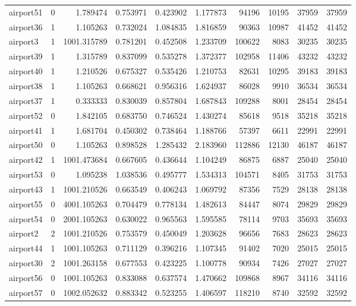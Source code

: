 \begin{longtable}{|l|r|r|r|r|r|r|r|r|r|}
airport51 & 0 & 1.789474 & 0.753971 & 0.423902 & 1.177873 & 94196 & 10195 & 37959 & 37959 \\
airport36 & 1 & 1.105263 & 0.732024 & 1.084835 & 1.816859 & 90363 & 10987 & 41452 & 41452 \\
airport3 & 1 & 1001.315789 & 0.781201 & 0.452508 & 1.233709 & 100622 & 8083 & 30235 & 30235 \\
airport39 & 1 & 1.315789 & 0.837099 & 0.535278 & 1.372377 & 102958 & 11406 & 43232 & 43232 \\
airport40 & 1 & 1.210526 & 0.675327 & 0.535426 & 1.210753 & 82631 & 10295 & 39183 & 39183 \\
airport38 & 1 & 1.105263 & 0.668621 & 0.956316 & 1.624937 & 86028 & 9910 & 36534 & 36534 \\
airport37 & 1 & 0.333333 & 0.830039 & 0.857804 & 1.687843 & 109288 & 8001 & 28454 & 28454 \\
airport52 & 0 & 1.842105 & 0.683750 & 0.746524 & 1.430274 & 85618 & 9518 & 35218 & 35218 \\
airport41 & 1 & 1.681704 & 0.450302 & 0.738464 & 1.188766 & 57397 & 6611 & 22991 & 22991 \\
airport50 & 0 & 1.105263 & 0.898528 & 1.285432 & 2.183960 & 112886 & 12130 & 46187 & 46187 \\
airport42 & 1 & 1001.473684 & 0.667605 & 0.436644 & 1.104249 & 86875 & 6887 & 25040 & 25040 \\
airport53 & 0 & 1.095238 & 1.038536 & 0.495777 & 1.534313 & 104571 & 8405 & 31753 & 31753 \\
airport43 & 1 & 1001.210526 & 0.663549 & 0.406243 & 1.069792 & 87356 & 7529 & 28138 & 28138 \\
airport55 & 0 & 4001.105263 & 0.704479 & 0.778134 & 1.482613 & 84447 & 8074 & 29829 & 29829 \\
airport54 & 0 & 2001.105263 & 0.630022 & 0.965563 & 1.595585 & 78114 & 9703 & 35693 & 35693 \\
airport2 & 2 & 1001.210526 & 0.753579 & 0.450049 & 1.203628 & 96656 & 7683 & 28623 & 28623 \\
airport44 & 1 & 1001.105263 & 0.711129 & 0.396216 & 1.107345 & 91402 & 7020 & 25015 & 25015 \\
airport30 & 2 & 1001.263158 & 0.677553 & 0.423225 & 1.100778 & 90934 & 7426 & 27027 & 27027 \\
airport56 & 0 & 1001.105263 & 0.833088 & 0.637574 & 1.470662 & 109868 & 8967 & 34116 & 34116 \\
airport57 & 0 & 1002.052632 & 0.883342 & 0.523255 & 1.406597 & 118210 & 8740 & 32592 & 32592 \\

\end{longtable}

